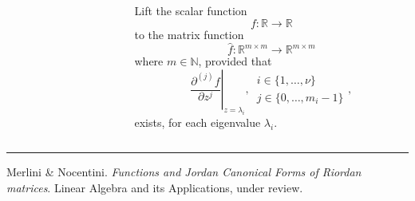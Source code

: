 \documentclass[9pt]{beamer}
\begin{document}
\begin{frame}[fragile]
\begin{columns}
\begin{column}{0.6\textwidth}
\begin{displaymath}
        \end{displaymath}
    \end{column}
    \begin{column}{0.4\textwidth}
    Lift the scalar function $$f: \mathbb{R} \rightarrow \mathbb{R}$$
    to the matrix function
    $$\hat{f}: \mathbb{R}^{m\times m} \rightarrow \mathbb{R}^{m\times m}$$
    where $m\in\mathbb{N}$, provided that
    \begin{displaymath}
        \left. \frac{\partial^{(j)}{f}}{\partial{z}^{j}} \right|_{z=\lambda_{i}},\,
        \begin{array}{l} 
            i\in \lbrace 1, \ldots, \nu \rbrace \\
            j \in \lbrace 0, \ldots, m_{i}-1 \rbrace
        \end{array},
    \end{displaymath}
    exists, for each eigenvalue $\lambda_{i}$.
    \end{column}
\end{columns}
\vfill
\noindent\rule{\textwidth}{0.1pt}
{\footnotesize
Merlini \& Nocentini. \textit{Functions and Jordan Canonical Forms of Riordan
matrices}. \newline Linear Algebra and its Applications, under review.}
\end{frame}
\end{document}
